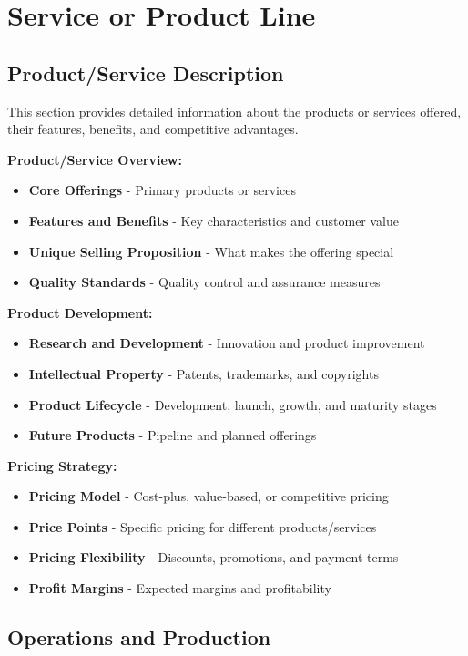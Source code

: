\documentclass[12pt]{article}
\begin{document}
\section{Service or Product Line}

\subsection{Product/Service Description}
This section provides detailed information about the products or services offered, their features, benefits, and competitive advantages.

\textbf{Product/Service Overview:}
\begin{itemize}
    \item \textbf{Core Offerings} - Primary products or services
    \item \textbf{Features and Benefits} - Key characteristics and customer value
    \item \textbf{Unique Selling Proposition} - What makes the offering special
    \item \textbf{Quality Standards} - Quality control and assurance measures
\end{itemize}

\textbf{Product Development:}
\begin{itemize}
    \item \textbf{Research and Development} - Innovation and product improvement
    \item \textbf{Intellectual Property} - Patents, trademarks, and copyrights
    \item \textbf{Product Lifecycle} - Development, launch, growth, and maturity stages
    \item \textbf{Future Products} - Pipeline and planned offerings
\end{itemize}

\textbf{Pricing Strategy:}
\begin{itemize}
    \item \textbf{Pricing Model} - Cost-plus, value-based, or competitive pricing
    \item \textbf{Price Points} - Specific pricing for different products/services
    \item \textbf{Pricing Flexibility} - Discounts, promotions, and payment terms
    \item \textbf{Profit Margins} - Expected margins and profitability
\end{itemize}

\subsection{Operations and Production}
\end{document}
